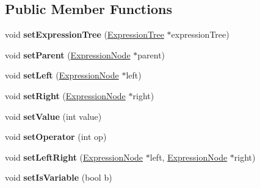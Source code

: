 \subsection*{Public Member Functions}
\begin{DoxyCompactItemize}
\item 
void {\bfseries set\+Expression\+Tree} (\hyperlink{classExpressionTree}{Expression\+Tree} $\ast$expression\+Tree)\hypertarget{classExpressionNode_a97010b6f697941a0522f1f13a55e1537}{}\label{classExpressionNode_a97010b6f697941a0522f1f13a55e1537}

\item 
void {\bfseries set\+Parent} (\hyperlink{classExpressionNode}{Expression\+Node} $\ast$parent)\hypertarget{classExpressionNode_aeed821d5466822cf6c84a16edd88428b}{}\label{classExpressionNode_aeed821d5466822cf6c84a16edd88428b}

\item 
void {\bfseries set\+Left} (\hyperlink{classExpressionNode}{Expression\+Node} $\ast$left)\hypertarget{classExpressionNode_a4a1082d2ef3d4eb90c88d45ff7b3c92e}{}\label{classExpressionNode_a4a1082d2ef3d4eb90c88d45ff7b3c92e}

\item 
void {\bfseries set\+Right} (\hyperlink{classExpressionNode}{Expression\+Node} $\ast$right)\hypertarget{classExpressionNode_ad123db23336006f9d37458dfcd240158}{}\label{classExpressionNode_ad123db23336006f9d37458dfcd240158}

\item 
void {\bfseries set\+Value} (int value)\hypertarget{classExpressionNode_a84c28fcc2296c5d6cfa8a71595cee32d}{}\label{classExpressionNode_a84c28fcc2296c5d6cfa8a71595cee32d}

\item 
void {\bfseries set\+Operator} (int op)\hypertarget{classExpressionNode_ac4c9f6574b462191267c2a43f64503ec}{}\label{classExpressionNode_ac4c9f6574b462191267c2a43f64503ec}

\item 
void {\bfseries set\+Left\+Right} (\hyperlink{classExpressionNode}{Expression\+Node} $\ast$left, \hyperlink{classExpressionNode}{Expression\+Node} $\ast$right)\hypertarget{classExpressionNode_a27a7dbaa192ed918f2485c9f67389f7a}{}\label{classExpressionNode_a27a7dbaa192ed918f2485c9f67389f7a}

\item 
void {\bfseries set\+Is\+Variable} (bool b)\hypertarget{classExpressionNode_af142d717316c6b0d5cdba9cef7240cca}{}\label{classExpressionNode_af142d717316c6b0d5cdba9cef7240cca}


\end{DoxyCompactItemize}
